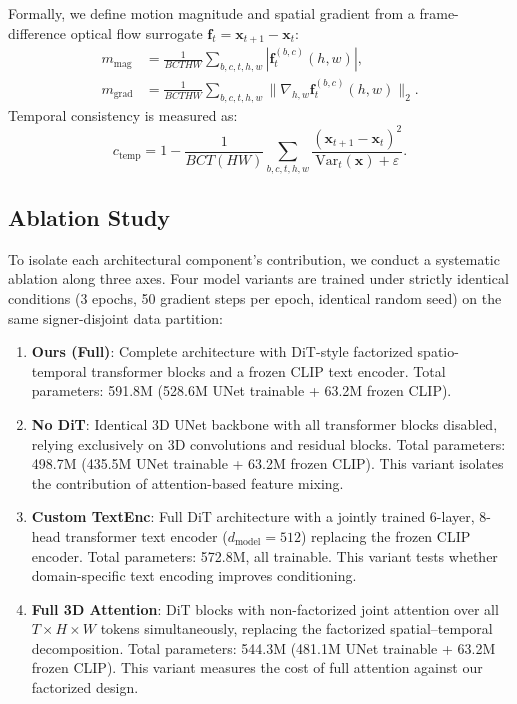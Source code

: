 \documentclass{ieeeaccess}
\begin{document}
Formally, we define motion magnitude and spatial gradient from a frame-difference optical flow surrogate $\mathbf{f}_t = \mathbf{x}_{t+1} - \mathbf{x}_t$:
\begin{align}
    m_\mathrm{mag} &= \frac{1}{BCTHW}\sum_{b,c,t,h,w} |\mathbf{f}^{(b,c)}_t(h,w)|, \\
    m_\mathrm{grad} &= \frac{1}{BCTHW}\sum_{b,c,t,h,w} \|\nabla_{h,w} \mathbf{f}^{(b,c)}_t(h,w)\|_2.
\end{align}
Temporal consistency is measured as:
\begin{equation}
    c_\mathrm{temp} = 1 - \frac{1}{BCT(HW)}\sum_{b,c,t,h,w} \frac{(\mathbf{x}_{t+1}-\mathbf{x}_t)^2}{\mathrm{Var}_t(\mathbf{x}) + \varepsilon}.
\end{equation}

\subsection{Ablation Study}
\label{sec:ablation}

To isolate each architectural component's contribution, we conduct a systematic ablation along three axes. Four model variants are trained under strictly identical conditions (3 epochs, 50 gradient steps per epoch, identical random seed) on the same signer-disjoint data partition:

\begin{enumerate}
    \item \textbf{Ours (Full)}: Complete architecture with DiT-style factorized spatio-temporal transformer blocks and a frozen CLIP text encoder. Total parameters: 591.8M (528.6M UNet trainable + 63.2M frozen CLIP).
    \item \textbf{No DiT}: Identical 3D UNet backbone with all transformer blocks disabled, relying exclusively on 3D convolutions and residual blocks. Total parameters: 498.7M (435.5M UNet trainable + 63.2M frozen CLIP). This variant isolates the contribution of attention-based feature mixing.
    \item \textbf{Custom TextEnc}: Full DiT architecture with a jointly trained 6-layer, 8-head transformer text encoder ($d_{\mathrm{model}}=512$) replacing the frozen CLIP encoder. Total parameters: 572.8M, all trainable. This variant tests whether domain-specific text encoding improves conditioning.
    \item \textbf{Full 3D Attention}: DiT blocks with non-factorized joint attention over all $T \times H \times W$ tokens simultaneously, replacing the factorized spatial--temporal decomposition. Total parameters: 544.3M (481.1M UNet trainable + 63.2M frozen CLIP). This variant measures the cost of full attention against our factorized design.
\end{enumerate}
\end{document}
